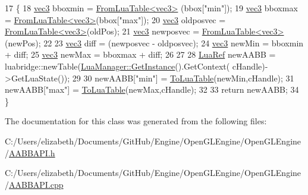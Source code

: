 \begin{DoxyCode}
17 \{
18     \hyperlink{_types_8h_a3d0ce73e3199de81565fb01632415288}{vec3} bboxmin = \hyperlink{_math_a_p_i_8h_a57e551c31a30e104a0c0ca525557f265}{FromLuaTable<vec3>} (bbox[\textcolor{stringliteral}{"min"}]);
19     \hyperlink{_types_8h_a3d0ce73e3199de81565fb01632415288}{vec3} bboxmax = \hyperlink{_math_a_p_i_8h_a57e551c31a30e104a0c0ca525557f265}{FromLuaTable<vec3>}(bbox[\textcolor{stringliteral}{"max"}]);
20     \hyperlink{_types_8h_a3d0ce73e3199de81565fb01632415288}{vec3} oldposvec = \hyperlink{_math_a_p_i_8h_a57e551c31a30e104a0c0ca525557f265}{FromLuaTable<vec3>}(oldPos);
21     \hyperlink{_types_8h_a3d0ce73e3199de81565fb01632415288}{vec3} newposvec = \hyperlink{_math_a_p_i_8h_a57e551c31a30e104a0c0ca525557f265}{FromLuaTable<vec3>}(newPos);
22 
23     \hyperlink{_types_8h_a3d0ce73e3199de81565fb01632415288}{vec3} diff = (newposvec - oldposvec);
24     \hyperlink{_types_8h_a3d0ce73e3199de81565fb01632415288}{vec3} newMin = bboxmin + diff;
25     \hyperlink{_types_8h_a3d0ce73e3199de81565fb01632415288}{vec3} newMax = bboxmax + diff;
26 
27 
28     \hyperlink{_lua_context_8h_a2220f03700ba40e366f0ee2d684d5c91}{LuaRef} newAABB = luabridge::newTable(\hyperlink{class_singleton_a74f32751d99bf3cc95fe17aba11f4b07}{LuaManager::GetInstance}().GetContext(
      cHandle)->GetLuaState());
29 
30     newAABB[\textcolor{stringliteral}{"min"}] = \hyperlink{_math_a_p_i_8h_a6d4bdd6987400be64a6a029dbf3e5fb2}{ToLuaTable}(newMin,cHandle);
31     newAABB[\textcolor{stringliteral}{"max"}] = \hyperlink{_math_a_p_i_8h_a6d4bdd6987400be64a6a029dbf3e5fb2}{ToLuaTable}(newMax,cHandle);
32 
33     \textcolor{keywordflow}{return} newAABB;
34 \}
\end{DoxyCode}


The documentation for this class was generated from the following files\+:\begin{DoxyCompactItemize}
\item 
C\+:/\+Users/elizabeth/\+Documents/\+Git\+Hub/\+Engine/\+Open\+G\+L\+Engine/\+Open\+G\+L\+Engine/\hyperlink{_a_a_b_b_a_p_i_8h}{A\+A\+B\+B\+A\+P\+I.\+h}\item 
C\+:/\+Users/elizabeth/\+Documents/\+Git\+Hub/\+Engine/\+Open\+G\+L\+Engine/\+Open\+G\+L\+Engine/\hyperlink{_a_a_b_b_a_p_i_8cpp}{A\+A\+B\+B\+A\+P\+I.\+cpp}\end{DoxyCompactItemize}
